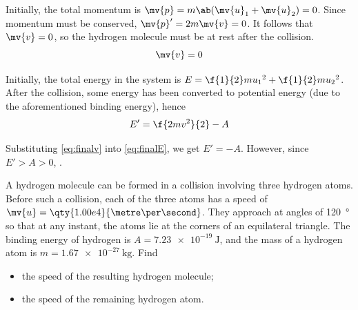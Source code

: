 Initially, the total momentum is \(\mv{p} = m\ab(\mv{u}_1 + \mv{u}_2)
= 0\). Since momentum
must be conserved, \(\mv{p}' = 2m\mv{v} = 0\). It follows that
\(\mv{v} = 0\), so
the hydrogen molecule must be at rest after the collision.
\begin{equation}
	\mv{v} = 0
	\label{eq:finalv}
\end{equation}

Initially, the total energy in the system is \(E = \f{1}{2}m{u_1}^2 +
\f{1}{2}m{u_2}^2\).
After the collision, some energy has been converted to potential
energy (due to the aforementioned binding energy),
hence
\begin{equation}
	E' = \f{2mv^2}{2} - A
	\label{eq:finalE}
\end{equation}

Substituting \cref{eq:finalv} into \cref{eq:finalE}, we get \(E' = -A\).
However, since \(E' > A > 0\), .

\begin{problem}
A hydrogen molecule can be formed in a collision involving three
hydrogen atoms.
Before such a collision, each of the three atoms has a speed of
\(\mv{u}=\qty{1.00e4}{\metre\per\second}\). They approach at angles
of \qty{120}{\degree}
so that at any instant, the atoms lie at the corners of an
equilateral triangle.
The binding energy of hydrogen is \(A = \qty{7.23e-19}{\joule}\), and the mass
of a hydrogen atom is \(m = \qty{1.67e-27}{\kg}\). Find
\begin{itemize}
	\item the speed of the resulting hydrogen molecule;
	\item the speed of the remaining hydrogen atom.
\end{itemize}
\end{problem}


